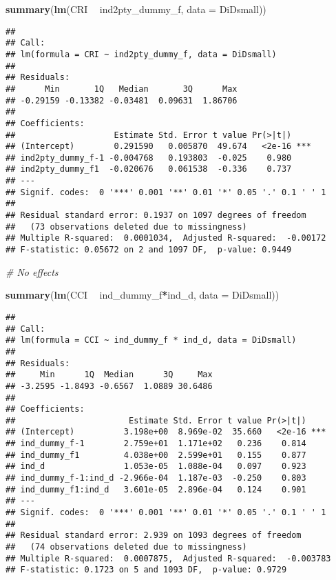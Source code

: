\documentclass[]{article}
\newenvironment{Shaded}{\begin{snugshade}}{\end{snugshade}}
\newcommand{\KeywordTok}[1]{\textcolor[rgb]{0.13,0.29,0.53}{\textbf{#1}}}
\newcommand{\DataTypeTok}[1]{\textcolor[rgb]{0.13,0.29,0.53}{#1}}
\newcommand{\StringTok}[1]{\textcolor[rgb]{0.31,0.60,0.02}{#1}}
\newcommand{\CommentTok}[1]{\textcolor[rgb]{0.56,0.35,0.01}{\textit{#1}}}
\newcommand{\OperatorTok}[1]{\textcolor[rgb]{0.81,0.36,0.00}{\textbf{#1}}}
\newcommand{\NormalTok}[1]{#1}
\begin{document}
\begin{Shaded}
\begin{Highlighting}[]
\KeywordTok{summary}\NormalTok{(}\KeywordTok{lm}\NormalTok{(CRI }\OperatorTok{~}\StringTok{ }\NormalTok{ind2pty_dummy_f, }\DataTypeTok{data =}\NormalTok{ DiDsmall))}
\end{Highlighting}
\end{Shaded}

\begin{verbatim}
## 
## Call:
## lm(formula = CRI ~ ind2pty_dummy_f, data = DiDsmall)
## 
## Residuals:
##      Min       1Q   Median       3Q      Max 
## -0.29159 -0.13382 -0.03481  0.09631  1.86706 
## 
## Coefficients:
##                    Estimate Std. Error t value Pr(>|t|)    
## (Intercept)        0.291590   0.005870  49.674   <2e-16 ***
## ind2pty_dummy_f-1 -0.004768   0.193803  -0.025    0.980    
## ind2pty_dummy_f1  -0.020676   0.061538  -0.336    0.737    
## ---
## Signif. codes:  0 '***' 0.001 '**' 0.01 '*' 0.05 '.' 0.1 ' ' 1
## 
## Residual standard error: 0.1937 on 1097 degrees of freedom
##   (73 observations deleted due to missingness)
## Multiple R-squared:  0.0001034,  Adjusted R-squared:  -0.00172 
## F-statistic: 0.05672 on 2 and 1097 DF,  p-value: 0.9449
\end{verbatim}

\begin{Shaded}
\begin{Highlighting}[]
\CommentTok{# No effects }

\KeywordTok{summary}\NormalTok{(}\KeywordTok{lm}\NormalTok{(CCI }\OperatorTok{~}\StringTok{ }\NormalTok{ind_dummy_f}\OperatorTok{*}\NormalTok{ind_d, }\DataTypeTok{data =}\NormalTok{ DiDsmall))}
\end{Highlighting}
\end{Shaded}

\begin{verbatim}
## 
## Call:
## lm(formula = CCI ~ ind_dummy_f * ind_d, data = DiDsmall)
## 
## Residuals:
##     Min      1Q  Median      3Q     Max 
## -3.2595 -1.8493 -0.6567  1.0889 30.6486 
## 
## Coefficients:
##                       Estimate Std. Error t value Pr(>|t|)    
## (Intercept)          3.198e+00  8.969e-02  35.660   <2e-16 ***
## ind_dummy_f-1        2.759e+01  1.171e+02   0.236    0.814    
## ind_dummy_f1         4.038e+00  2.599e+01   0.155    0.877    
## ind_d                1.053e-05  1.088e-04   0.097    0.923    
## ind_dummy_f-1:ind_d -2.966e-04  1.187e-03  -0.250    0.803    
## ind_dummy_f1:ind_d   3.601e-05  2.896e-04   0.124    0.901    
## ---
## Signif. codes:  0 '***' 0.001 '**' 0.01 '*' 0.05 '.' 0.1 ' ' 1
## 
## Residual standard error: 2.939 on 1093 degrees of freedom
##   (74 observations deleted due to missingness)
## Multiple R-squared:  0.0007875,  Adjusted R-squared:  -0.003783 
## F-statistic: 0.1723 on 5 and 1093 DF,  p-value: 0.9729
\end{verbatim}
\end{document}
